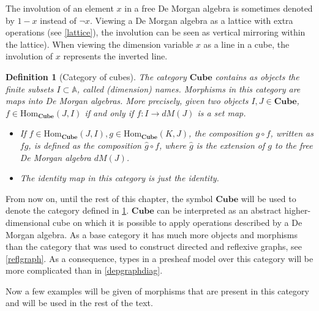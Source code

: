 \documentclass[12pt,a4paper,twoside,xetex]{book} %
\newtheorem{definition}[theorem]{Definition}
\newcommand{\homo}[3]{\text{Hom}_{#1}\left(#2,#3\right)}
\newcommand{\cube}[0]{\textbf{Cube}}
\begin{document}
The involution of an element $x$ in a free De Morgan algebra is sometimes 
denoted by $1-x$ instead  of $\neg x$. Viewing a De Morgan algebra as a lattice with extra operations (see \cref{lattice}), the involution can be seen as vertical mirroring within the lattice). When viewing the dimension variable $x$ as a line in a cube, the involution of $x$ represents the inverted line. 

\begin{definition}[Category of cubes]\label{cubcat}
  The category $\cube$ contains as objects the  finite subsets $I \subset 
\mathbb{A}$, called (dimension) names. Morphisms in this category are maps into 
De Morgan algebras. More precisely, given two objects $I,J \in \cube$, $f 
\in \text{Hom}_{\cube}(J,I)$ if and only if $f: I \rightarrow dM(J)$ is a 
set map.
  \begin{itemize}
  \item  If $f \in \homo{\cube}{J}{I}, g \in \homo{\cube}{K}{J}$, 
the composition $g \circ f$, written as $fg$, is defined as the composition  
$\hat{g} \circ f$, where $\hat{g}$ is the extension of $g$ to the free De 
Morgan algebra $dM(J)$.
    \item The identity map in this category is just the identity.
\end{itemize}
    \end{definition}

From now on, until the rest of this chapter, the symbol $\cube$ will be 
used to denote the category defined in \cref{cubcat}. $\cube$ can be 
interpreted as an abstract higher-dimensional cube on which it is possible to 
apply operations described by a De Morgan algebra. As a base category it has 
much more objects and morphisms than the category that was used to construct 
directed and reflexive graphs, see \cref{reflgraph}. As a consequence, types in 
a presheaf model over this category will be more complicated than in 
\cref{depgraphdiag}.

Now a few examples will be given of morphisms that are present in this category 
and will be used in the rest of the text.
\end{document}

